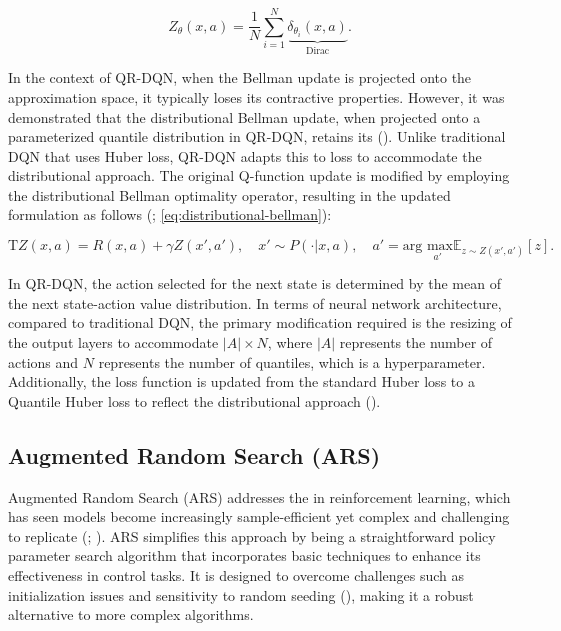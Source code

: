 \begin{equation}
    Z_\theta(x, a) = \frac{1}{N} \sum_{i=1}^{N} \underbrace{\delta_{\theta_i}(x, a)}_{\text{Dirac}}.
    \label{eq:parametric-z-variable}
\end{equation}

\noindent In the context of QR-DQN, when the Bellman update is projected onto the approximation space, it typically loses its contractive properties. However, it was demonstrated that the distributional Bellman update, when projected onto a parameterized quantile distribution in QR-DQN, retains its  (\textcolor{deepblue}{\cite{bellemare2017distributional}}). Unlike traditional DQN that uses Huber loss, QR-DQN adapts this to  loss to accommodate the distributional approach. The original Q-function update is modified by employing the distributional Bellman optimality operator, resulting in the updated formulation as follows (\textcolor{deepblue}{\cite{dabney2017distributional}; \autoref{eq:distributional-bellman}}):

\begin{equation}
    \mathrm{T} Z(x, a) = R(x, a) + \gamma Z(x', a'), \quad x' \sim P(\cdot|x, a), \quad a' = \text{arg}\underset{a'}{\text{ max}} \mathbb{E}_{z \sim Z(x', a')} \left[  z \right].
    \label{eq:distributional-bellman}
\end{equation}

\noindent In QR-DQN, the action selected for the next state is determined by the mean of the next state-action value distribution. In terms of neural network architecture, compared to traditional DQN, the primary modification required is the resizing of the output layers to accommodate $|A| \times N$, where $|A|$ represents the number of actions and $N$ represents the number of quantiles, which is a hyperparameter. Additionally, the loss function is updated from the standard Huber loss to a Quantile Huber loss to reflect the distributional approach (\textcolor{deepblue}{\cite{yang2020fully}}).

\subsection{Augmented Random Search (ARS)}
\label{sec:ars}

\noindent Augmented Random Search (ARS) addresses the  in reinforcement learning, which has seen models become increasingly sample-efficient yet complex and challenging to replicate (\textcolor{deepblue}{\cite{mania2018simple}; \cite{stable-baselines3}}). ARS simplifies this approach by being a straightforward policy parameter search algorithm that incorporates basic techniques to enhance its effectiveness in control tasks. It is designed to overcome challenges such as initialization issues and sensitivity to random seeding (\textcolor{deepblue}{\cite{henderson2019deep}}), making it a robust alternative to more complex algorithms.

